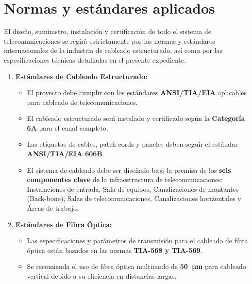 \documentclass[12pt,a4paper]{report}
\begin{document}

\section{Normas y estándares aplicados}

El diseño, suministro, instalación y certificación de todo el sistema de
telecomunicaciones se regirá estrictamente por las normas y estándares
internacionales de la industria de cableado estructurado, así como por las
especificaciones técnicas detalladas en el presente expediente.

\begin{enumerate}[label=\arabic*.,leftmargin=2.5em,itemsep=0pt,parsep=0pt]
  \item \textbf{Estándares de Cableado Estructurado:}
    \begin{itemize}[label={},leftmargin=2.5em,itemsep=0pt,parsep=0pt,topsep=0pt]
      \item El proyecto debe cumplir con los estándares \textbf{ANSI/TIA/EIA}
        aplicables para cableado de telecomunicaciones.
      \item El cableado estructurado será instalado y certificado según la
        \textbf{Categoría 6A} para el canal completo.
      \item Las etiquetas de cables, patch cords y paneles deben seguir el
        estándar \textbf{ANSI/TIA/EIA 606B}.
      \item El sistema de cableado debe ser diseñado bajo la premisa de los
        \textbf{seis componentes clave} de la infraestructura de
        telecomunicaciones: Instalaciones de entrada, Sala de equipos,
        Canalizaciones de montantes (Back-bone), Salas de telecomunicaciones,
        Canalizaciones horizontales y Áreas de trabajo.
    \end{itemize}

  \item \textbf{Estándares de Fibra Óptica:}
    \begin{itemize}[label={},leftmargin=2.5em,itemsep=0pt,parsep=0pt,topsep=0pt]
      \item Las especificaciones y parámetros de transmisión para el cableado
        de fibra óptica están basados en las normas \textbf{TIA-568 y TIA-569}.
      \item Se recomienda el uso de fibra óptica multimodo de \textbf{50~µm}
        para cableado vertical debido a su eficiencia en distancias largas.
    \end{itemize}


\end{enumerate}
\end{document}
